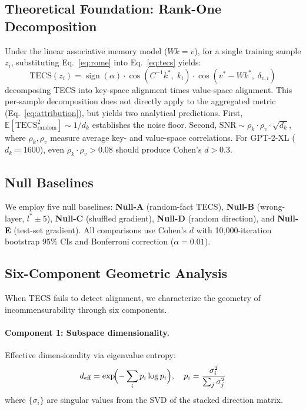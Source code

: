 \subsection{Theoretical Foundation: Rank-One Decomposition}
\label{sec:theory}

Under the linear associative memory model ($Wk = v$), for a single training sample $z_i$, substituting Eq.~\ref{eq:rome} into Eq.~\ref{eq:tecs} yields:
\begin{equation}
\text{TECS}(z_i) = \operatorname{sign}(\alpha) \cdot \cos(C^{-1}k^*,\; k_i) \cdot \cos(v^* - Wk^*,\; \delta_{v,i})
\label{eq:decomp}
\end{equation}
decomposing TECS into key-space alignment times value-space alignment.
This per-sample decomposition does not directly apply to the aggregated metric (Eq.~\ref{eq:attribution}), but yields two analytical predictions.
First, $\mathbb{E}[\text{TECS}_{\text{random}}^2] \sim 1/d_k$ establishes the noise floor.
Second, $\text{SNR} \sim \rho_k \cdot \rho_v \cdot \sqrt{d_k}$, where $\rho_k, \rho_v$ measure average key- and value-space correlations.
For GPT-2-XL ($d_k = 1600$), even $\rho_k \cdot \rho_v > 0.08$ should produce Cohen's $d > 0.3$.

\subsection{Null Baselines}
\label{sec:null}

We employ five null baselines: \textbf{Null-A} (random-fact TECS), \textbf{Null-B} (wrong-layer, $l^* \pm 5$), \textbf{Null-C} (shuffled gradient), \textbf{Null-D} (random direction), and \textbf{Null-E} (test-set gradient).
All comparisons use Cohen's $d$ with 10{,}000-iteration bootstrap 95\% CIs and Bonferroni correction ($\alpha = 0.01$).

\subsection{Six-Component Geometric Analysis}
\label{sec:framework}

When TECS fails to detect alignment, we characterize the geometry of incommensurability through six components.

\paragraph{Component 1: Subspace dimensionality.} Effective dimensionality via eigenvalue entropy:
\begin{equation}
d_{\text{eff}} = \exp\!\Bigl(-\sum_i p_i \log p_i\Bigr), \quad p_i = \frac{\sigma_i^2}{\sum_j \sigma_j^2}
\label{eq:effdim}
\end{equation}
where $\{\sigma_i\}$ are singular values from the SVD of the stacked direction matrix.

